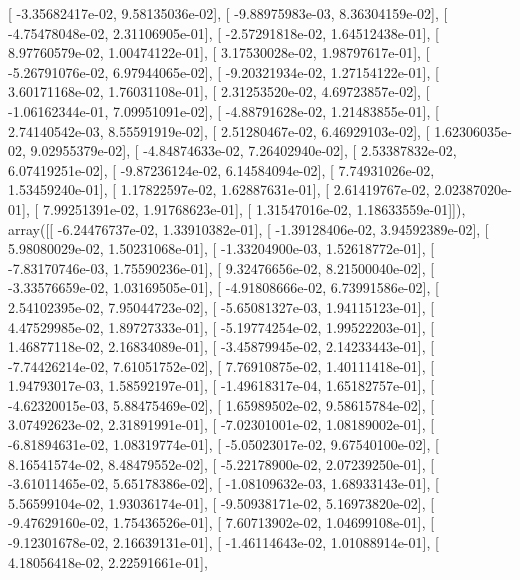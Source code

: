 \documentclass{article}
\begin{document}
       [ -3.35682417e-02,   9.58135036e-02],
       [ -9.88975983e-03,   8.36304159e-02],
       [ -4.75478048e-02,   2.31106905e-01],
       [ -2.57291818e-02,   1.64512438e-01],
       [  8.97760579e-02,   1.00474122e-01],
       [  3.17530028e-02,   1.98797617e-01],
       [ -5.26791076e-02,   6.97944065e-02],
       [ -9.20321934e-02,   1.27154122e-01],
       [  3.60171168e-02,   1.76031108e-01],
       [  2.31253520e-02,   4.69723857e-02],
       [ -1.06162344e-01,   7.09951091e-02],
       [ -4.88791628e-02,   1.21483855e-01],
       [  2.74140542e-03,   8.55591919e-02],
       [  2.51280467e-02,   6.46929103e-02],
       [  1.62306035e-02,   9.02955379e-02],
       [ -4.84874633e-02,   7.26402940e-02],
       [  2.53387832e-02,   6.07419251e-02],
       [ -9.87236124e-02,   6.14584094e-02],
       [  7.74931026e-02,   1.53459240e-01],
       [  1.17822597e-02,   1.62887631e-01],
       [  2.61419767e-02,   2.02387020e-01],
       [  7.99251391e-02,   1.91768623e-01],
       [  1.31547016e-02,   1.18633559e-01]]), array([[ -6.24476737e-02,   1.33910382e-01],
       [ -1.39128406e-02,   3.94592389e-02],
       [  5.98080029e-02,   1.50231068e-01],
       [ -1.33204900e-03,   1.52618772e-01],
       [ -7.83170746e-03,   1.75590236e-01],
       [  9.32476656e-02,   8.21500040e-02],
       [ -3.33576659e-02,   1.03169505e-01],
       [ -4.91808666e-02,   6.73991586e-02],
       [  2.54102395e-02,   7.95044723e-02],
       [ -5.65081327e-03,   1.94115123e-01],
       [  4.47529985e-02,   1.89727333e-01],
       [ -5.19774254e-02,   1.99522203e-01],
       [  1.46877118e-02,   2.16834089e-01],
       [ -3.45879945e-02,   2.14233443e-01],
       [ -7.74426214e-02,   7.61051752e-02],
       [  7.76910875e-02,   1.40111418e-01],
       [  1.94793017e-03,   1.58592197e-01],
       [ -1.49618317e-04,   1.65182757e-01],
       [ -4.62320015e-03,   5.88475469e-02],
       [  1.65989502e-02,   9.58615784e-02],
       [  3.07492623e-02,   2.31891991e-01],
       [ -7.02301001e-02,   1.08189002e-01],
       [ -6.81894631e-02,   1.08319774e-01],
       [ -5.05023017e-02,   9.67540100e-02],
       [  8.16541574e-02,   8.48479552e-02],
       [ -5.22178900e-02,   2.07239250e-01],
       [ -3.61011465e-02,   5.65178386e-02],
       [ -1.08109632e-03,   1.68933143e-01],
       [  5.56599104e-02,   1.93036174e-01],
       [ -9.50938171e-02,   5.16973820e-02],
       [ -9.47629160e-02,   1.75436526e-01],
       [  7.60713902e-02,   1.04699108e-01],
       [ -9.12301678e-02,   2.16639131e-01],
       [ -1.46114643e-02,   1.01088914e-01],
       [  4.18056418e-02,   2.22591661e-01],
\end{document}
